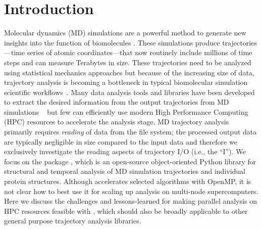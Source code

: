 
\section{Introduction}
\label{sec:introduction}

Molecular dynamics (MD) simulations are a powerful method to generate new insights into the function of biomolecules \cite{Borhani:2012mi, Dror:2012cr, Orozco:2014dq, Perilla:2015kx, Bottaro:2018aa}.
These simulations produce trajectories---time series of atomic coordinates---that now routinely include millions of time steps and can measure Terabytes in size.
These trajectories need to be analyzed using statistical mechanics approaches \cite{Tuckerman:2010cr, Mura:2014kx} but because of the increasing size of data, trajectory analysis is becoming a bottleneck in typical biomolecular simulation scientific workflows~\cite{Cheatham:2015}.
Many data analysis tools and libraries have been developed to extract the desired information from the output trajectories from MD simulations ~\cite{nmoldyn, nmoldyn-2012, Hum96, Hinsen:2000kx, Grant:2006ud, himach-2008, Romo:2009zr, Romo:2014bh, Michaud-Agrawal:2011fu, Gowers:2016aa, cpptraj-2013, McGibbon:2015aa, pteros2015, Doerr:2016aa} but few can efficiently use modern High Performance Computing (HPC) resources to accelerate the analysis stage.
MD trajectory analysis primarily requires \emph{reading} of data from the file system; the processed output data are typically negligible in size compared to the input data and therefore we exclusively investigate the reading aspects of trajectory I/O (i.e., the ``I'').
We focus on the  package \cite{Gowers:2016aa,Michaud-Agrawal:2011fu}, which is an open-source object-oriented Python library for structural and temporal analysis of MD simulation trajectories and individual protein structures.
Although  accelerates selected algorithms with OpenMP, it is not clear how to best use it for scaling up analysis on multi-node supercomputers.
Here we discuss the challenges and lessons-learned for making parallel analysis on HPC resources feasible with , which should also be broadly applicable to other general purpose trajectory analysis libraries.

